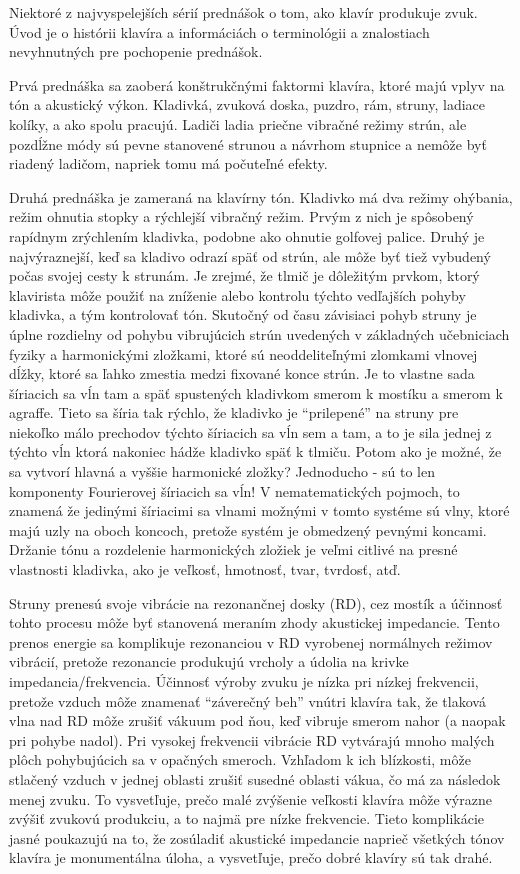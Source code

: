 \documentclass[11pt,a4paper]{book}
\begin{document}
Niektoré z najvyspelejších sérií prednášok o tom, ako klavír produkuje zvuk. Úvod je o histórii klavíra a informáciách o terminológii a znalostiach nevyhnutných pre pochopenie prednášok. 

Prvá prednáška sa zaoberá konštrukčnými faktormi klavíra, ktoré majú vplyv na tón a akustický výkon. Kladivká, zvuková doska, puzdro, rám, struny, ladiace kolíky, a ako spolu pracujú. Ladiči ladia priečne vibračné režimy strún, ale pozdĺžne módy sú pevne stanovené strunou a návrhom stupnice a nemôže byť riadený ladičom, napriek tomu má počuteľné efekty. 

Druhá prednáška je zameraná na klavírny tón. Kladivko má dva režimy ohýbania, režim ohnutia stopky a rýchlejší vibračný režim. Prvým z nich je spôsobený rapídnym zrýchlením kladivka, podobne ako ohnutie golfovej palice. Druhý je najvýraznejší, keď sa kladivo odrazí späť od strún, ale môže byť tiež vybudený počas svojej cesty k strunám. Je zrejmé, že tlmič je dôležitým prvkom, ktorý klavirista môže použiť na zníženie alebo kontrolu týchto vedľajších pohyby kladivka, a tým kontrolovať tón. Skutočný od času závisiaci pohyb struny je úplne rozdielny od pohybu vibrujúcich strún uvedených v základných učebniciach fyziky a harmonickými zložkami, ktoré sú neoddeliteľnými zlomkami vlnovej dĺžky, ktoré sa ľahko zmestia medzi fixované konce strún. Je to vlastne sada šíriacich sa vĺn tam a späť spustených kladivkom smerom k mostíku a smerom k agraffe. Tieto sa šíria tak rýchlo, že kladivko je “prilepené” na struny pre niekoľko málo prechodov týchto šíriacich sa vĺn sem a tam, a to je sila jednej z týchto vĺn ktorá nakoniec hádže kladivko späť k tlmiču. Potom ako je možné, že sa vytvorí hlavná a vyššie harmonické zložky? Jednoducho - sú to len komponenty Fourierovej šíriacich sa vĺn! V nematematických pojmoch, to znamená že jedinými šíriacimi sa vlnami možnými v tomto systéme sú vlny, ktoré majú uzly na oboch koncoch, pretože systém je obmedzený pevnými koncami. Držanie tónu a rozdelenie harmonických zložiek je veľmi citlivé na presné vlastnosti kladivka, ako je veľkosť, hmotnosť, tvar, tvrdosť, atď. 

Struny prenesú svoje vibrácie na rezonančnej dosky (RD), cez mostík a účinnosť tohto procesu môže byť stanovená meraním zhody akustickej impedancie. Tento prenos energie sa komplikuje rezonanciou v RD vyrobenej normálnych režimov vibrácií, pretože rezonancie produkujú vrcholy a údolia na krivke impedancia/frekvencia. Účinnosť výroby zvuku je nízka pri nízkej frekvencii, pretože vzduch môže znamenať “záverečný beh” vnútri klavíra tak, že tlaková vlna nad RD môže zrušiť vákuum pod ňou, keď vibruje smerom nahor (a naopak pri pohybe nadol). Pri vysokej frekvencii vibrácie RD vytvárajú mnoho malých plôch pohybujúcich sa v opačných smeroch. Vzhľadom k ich blízkosti, môže stlačený vzduch v jednej oblasti zrušiť susedné oblasti vákua, čo má za následok menej zvuku. To vysvetľuje, prečo malé zvýšenie veľkosti klavíra môže výrazne zvýšiť zvukovú produkciu, a to najmä pre nízke frekvencie. Tieto komplikácie jasné poukazujú na to, že zosúladiť akustické impedancie naprieč všetkých tónov klavíra je monumentálna úloha, a vysvetľuje, prečo dobré klavíry sú tak drahé. 
\end{document}
